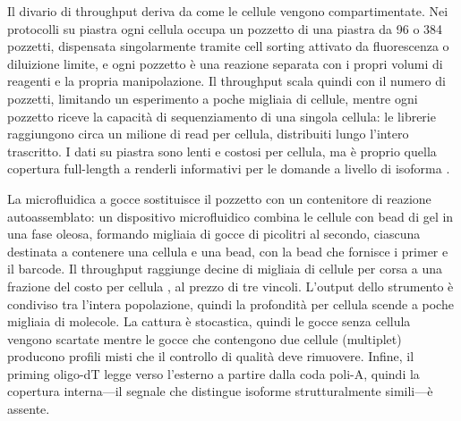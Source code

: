 Il divario di \gls{throughput} deriva da come le cellule vengono compartimentate. Nei protocolli su piastra ogni cellula occupa un pozzetto di una piastra da 96 o 384 pozzetti, dispensata singolarmente tramite cell sorting attivato da fluorescenza o diluizione limite, e ogni pozzetto è una reazione separata con i propri volumi di reagenti e la propria manipolazione. Il throughput scala quindi con il numero di pozzetti, limitando un esperimento a poche migliaia di cellule, mentre ogni pozzetto riceve la capacità di sequenziamento di una singola cellula: le librerie raggiungono circa un milione di read per cellula, distribuiti lungo l'intero trascritto. I dati su piastra sono lenti e costosi per cellula, ma è proprio quella copertura full-length a renderli informativi per le domande a livello di isoforma \cite{conte2024opportunities}.

La microfluidica a gocce sostituisce il pozzetto con un contenitore di reazione autoassemblato: un dispositivo microfluidico combina le cellule con bead di gel in una fase oleosa, formando migliaia di gocce di picolitri al secondo, ciascuna destinata a contenere una cellula e una bead, con la bead che fornisce i primer e il barcode. Il throughput raggiunge decine di migliaia di cellule per corsa a una frazione del costo per cellula \cite{ding2020systematic}, al prezzo di tre vincoli. L'output dello strumento è condiviso tra l'intera popolazione, quindi la profondità per cellula scende a poche migliaia di molecole. La cattura è stocastica, quindi le gocce senza cellula vengono scartate mentre le gocce che contengono due cellule (multiplet) producono profili misti che il controllo di qualità deve rimuovere. Infine, il priming oligo-dT legge verso l'esterno a partire dalla coda poli-A, quindi la copertura interna---il segnale che distingue isoforme strutturalmente simili---è assente.

